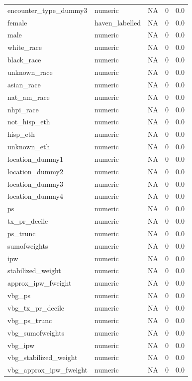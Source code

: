 \documentclass[
  11pt,
  letterpaper,
  DIV=11,
  numbers=noendperiod]{scrartcl}
\begin{document}
\begin{longtable*}{llrrr}
encounter\_type\_dummy3 & numeric & NA & 0 & 0.0\\
female & haven\_labelled & NA & 0 & 0.0\\
male & numeric & NA & 0 & 0.0\\
white\_race & numeric & NA & 0 & 0.0\\
\addlinespace
black\_race & numeric & NA & 0 & 0.0\\
unknown\_race & numeric & NA & 0 & 0.0\\
asian\_race & numeric & NA & 0 & 0.0\\
nat\_am\_race & numeric & NA & 0 & 0.0\\
nhpi\_race & numeric & NA & 0 & 0.0\\
\addlinespace
not\_hisp\_eth & numeric & NA & 0 & 0.0\\
hisp\_eth & numeric & NA & 0 & 0.0\\
unknown\_eth & numeric & NA & 0 & 0.0\\
location\_dummy1 & numeric & NA & 0 & 0.0\\
location\_dummy2 & numeric & NA & 0 & 0.0\\
\addlinespace
location\_dummy3 & numeric & NA & 0 & 0.0\\
location\_dummy4 & numeric & NA & 0 & 0.0\\
ps & numeric & NA & 0 & 0.0\\
tx\_pr\_decile & numeric & NA & 0 & 0.0\\
ps\_trunc & numeric & NA & 0 & 0.0\\
\addlinespace
sumofweights & numeric & NA & 0 & 0.0\\
ipw & numeric & NA & 0 & 0.0\\
stabilized\_weight & numeric & NA & 0 & 0.0\\
approx\_ipw\_fweight & numeric & NA & 0 & 0.0\\
vbg\_ps & numeric & NA & 0 & 0.0\\
\addlinespace
vbg\_tx\_pr\_decile & numeric & NA & 0 & 0.0\\
vbg\_ps\_trunc & numeric & NA & 0 & 0.0\\
vbg\_sumofweights & numeric & NA & 0 & 0.0\\
vbg\_ipw & numeric & NA & 0 & 0.0\\
vbg\_stabilized\_weight & numeric & NA & 0 & 0.0\\
\addlinespace
vbg\_approx\_ipw\_fweight & numeric & NA & 0 & 0.0\\*
\end{longtable*}
\endgroup{}
\end{document}
